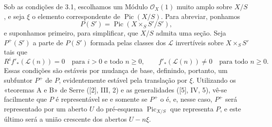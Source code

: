 
Sob as condições de 3.1, escolhamos um Módulo $\mathcal O_X(1)$ muito amplo
sobre $X/S$, e seja $\xi$ o elemento correspondente de
$\operatorname{Pic}(X/S)$. Para abreviar, ponhamos
\[
P(S')=\operatorname{Pic}(X\times_SS'/S'),
\]
e suponhamos primeiro, para simplificar, que $X/S$ admita uma seção. Seja
$P^+(S')$ a parte de $P(S')$ formada pelas classes dos $\mathcal L$ invertíveis
sobre $X\times_SS'$ tais que
\[
R^if'_*(\mathcal L(n))=0\quad\text{para $i>0$ e todo $n\geq0$},
\qquad
f'_*(\mathcal L(n))\neq0\quad\text{para todo $n\geq0$}.
\]
Essas condições são estáveis por mudança de base, definindo, portanto, um
subfuntor $P^+$ de $P$, evidentemente estável pela translação por $\xi$.
Utilizando os «teoremas A e B» de Serre ([2], III, 2) e as generalidades
([5], IV, 5), vê-se facilmente que $P$ é representável se e somente se $P^+$ o
é, e, nesse caso, $P^+$ será representado por um aberto $U$ do pré-esquema
$\operatorname{Pic}_{X/S}$ que representa $P$, e este último será a união
crescente dos abertos $U-n\xi$.

